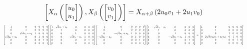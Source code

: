 \documentclass[11pt]{article}
\theoremstyle{definition}
\begin{document}
\[
\scaletoalign{\textwidth}{\left[ X_{\alpha}\left(\left[\begin{matrix}u_{0}\\u_{1}\end{matrix}\right]\right), X_{\beta}\left(\left[\begin{matrix}v_{0}\\v_{1}\end{matrix}\right]\right) \right] = X_{\alpha + \beta}\left(2 u_{0} v_{1} + 2 u_{1} v_{0}\right)}
\]
\[
\scaletoalign{\textwidth}{{\left[\begin{matrix}1 & 0 & 0 & 0 & 0 & 0\\0 & 1 & 0 & 0 & 0 & 0\\0 & \sqrt{d} u_{1} - u_{0} & 1 & 0 & 0 & 0\\\sqrt{d} u_{1} + u_{0} & 0 & 0 & 1 & 0 & 0\\0 & 0 & 0 & 0 & 1 & 0\\0 & 0 & 0 & 0 & 0 & 1\end{matrix}\right]} {\left[\begin{matrix}1 & \sqrt{d} v_{1} + v_{0} & 0 & 0 & 0 & 0\\0 & 1 & 0 & 0 & 0 & 0\\0 & 0 & 1 & 0 & 0 & 0\\0 & 0 & \sqrt{d} v_{1} - v_{0} & 1 & 0 & 0\\0 & 0 & 0 & 0 & 1 & 0\\0 & 0 & 0 & 0 & 0 & 1\end{matrix}\right]} {\left[\begin{matrix}1 & 0 & 0 & 0 & 0 & 0\\0 & 1 & 0 & 0 & 0 & 0\\0 & - \sqrt{d} u_{1} + u_{0} & 1 & 0 & 0 & 0\\- \sqrt{d} u_{1} - u_{0} & 0 & 0 & 1 & 0 & 0\\0 & 0 & 0 & 0 & 1 & 0\\0 & 0 & 0 & 0 & 0 & 1\end{matrix}\right]} {\left[\begin{matrix}1 & - \sqrt{d} v_{1} - v_{0} & 0 & 0 & 0 & 0\\0 & 1 & 0 & 0 & 0 & 0\\0 & 0 & 1 & 0 & 0 & 0\\0 & 0 & - \sqrt{d} v_{1} + v_{0} & 1 & 0 & 0\\0 & 0 & 0 & 0 & 1 & 0\\0 & 0 & 0 & 0 & 0 & 1\end{matrix}\right]} = {\left[\begin{matrix}1 & 0 & 0 & 0 & 0 & 0\\0 & 1 & 0 & 0 & 0 & 0\\0 & 0 & 1 & 0 & 0 & 0\\0 & 2 \sqrt{d} \left(u_{0} v_{1} + u_{1} v_{0}\right) & 0 & 1 & 0 & 0\\0 & 0 & 0 & 0 & 1 & 0\\0 & 0 & 0 & 0 & 0 & 1\end{matrix}\right]}}
\]
\end{document}
